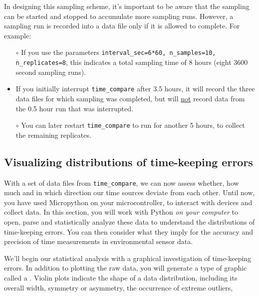 \begin{enumerate}
	\smallskip
	In designing this sampling scheme, it's important to be aware that the sampling can be started and stopped to accumulate more sampling runs.
	However, a sampling run is recorded into a data file only if it is allowed to complete.	For example:
\begin{itemize}
	\item[$\circ$] If you use the parameters \lstinline{interval_sec=6*60, n_samples=10, n_replicates=8}, this indicates a total sampling time of 8 hours (eight 3600 second sampling runs).
	
	\item[$\circ$] If you initially interrupt \lstinline{time_compare} after 3.5 hours, it will record the three data files for which sampling was completed, but will \underline{not} record data from the 0.5 hour run that was interrupted.
	
	\item[$\circ$] You can later restart \lstinline{time_compare} to run for another 5 hours, to collect the remaining replicates.
\end{itemize}		
\end{enumerate}


\subsection{Visualizing distributions of time-keeping errors}

With a set of data files from \lstinline{time_compare}, we can now assess whether, how much and in which direction our time sources deviate from each other. 
Until now, you have used Micropython on your microcontroller, to interact with devices and collect data.
In this section, you will work with Python \emph{on your computer} to open, parse and statistically analyze these data to understand the distributions of time-keeping errors.
You can then consider what they imply for the accuracy and precision of time measurements in environmental sensor data.  

We'll begin our statistical analysis with a graphical investigation of time-keeping errors. 
In addition to plotting the raw data, you will generate a type of graphic called a .
Violin plots indicate the shape of a data distribution, including its overall width, symmetry or asymmetry, the occurrence of extreme outliers, \etc

